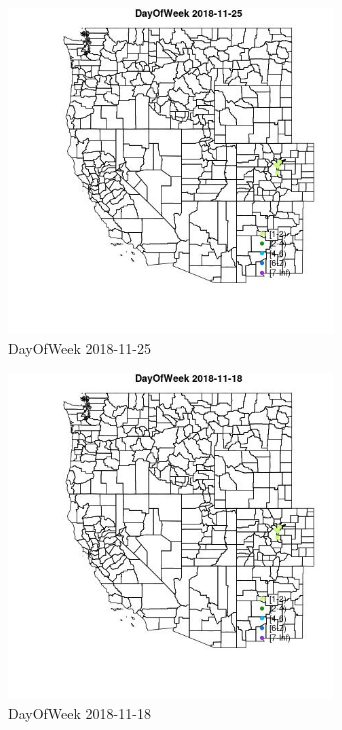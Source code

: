 \begin{figure} 
\centering  
\includegraphics[width=0.77\textwidth]{Code_Outputs/Report_ML_input_PM25_Step4_part_e_de_duplicated_aveswNAs_MapObsDayOfWeek2018-11-25.jpg} 
\caption{\label{fig:Report_ML_input_PM25_Step4_part_e_de_duplicated_aveswNAsMapObsDayOfWeek2018-11-25}DayOfWeek 2018-11-25} 
\end{figure} 
 

\begin{figure} 
\centering  
\includegraphics[width=0.77\textwidth]{Code_Outputs/Report_ML_input_PM25_Step4_part_e_de_duplicated_aveswNAs_MapObsDayOfWeek2018-11-18.jpg} 
\caption{\label{fig:Report_ML_input_PM25_Step4_part_e_de_duplicated_aveswNAsMapObsDayOfWeek2018-11-18}DayOfWeek 2018-11-18} 
\end{figure} 
 

